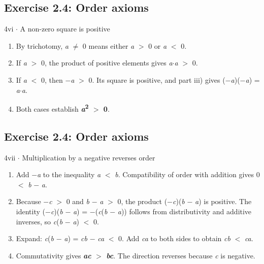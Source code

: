 \documentclass[11pt]{article}
\begin{document}
\begin{keepsection}\subsection{Exercise 2.4: Order axioms}

\begin{workedbox}{4vi \ensuremath{\cdot} A non-zero square is positive}
\begin{enumerate}
\item By trichotomy, \textit{a} \ensuremath{\neq} 0 means either \textit{a} \ensuremath{>} 0 or \textit{a} \ensuremath{<} 0.
\item If \textit{a} \ensuremath{>} 0, the product of positive elements gives \textit{a}\ensuremath{\cdot}\textit{a} \ensuremath{>} 0.
\item If \textit{a} \ensuremath{<} 0, then \ensuremath{-}\textit{a} \ensuremath{>} 0. Its square is positive, and part iii) gives (\ensuremath{-}\textit{a})(\ensuremath{-}\textit{a}) = \textit{a}\ensuremath{\cdot}\textit{a}.
\item Both cases establish \textbf{\textit{a}\textsuperscript{2} \ensuremath{>} 0}.
\end{enumerate}
\end{workedbox}

\end{keepsection}
\begin{keepsection}\subsection{Exercise 2.4: Order axioms}

\begin{workedbox}{4vii \ensuremath{\cdot} Multiplication by a negative reverses order}
\begin{enumerate}
\item Add \ensuremath{-}\textit{a} to the inequality \textit{a} \ensuremath{<} \textit{b}. Compatibility of order with addition gives 0 \ensuremath{<} \textit{b} \ensuremath{-} \textit{a}.
\item Because \ensuremath{-}\textit{c} \ensuremath{>} 0 and \textit{b} \ensuremath{-} \textit{a} \ensuremath{>} 0, the product (\ensuremath{-}\textit{c})(\textit{b} \ensuremath{-} \textit{a}) is positive. The identity (\ensuremath{-}\textit{c})(\textit{b} \ensuremath{-} \textit{a}) = \ensuremath{-}(\textit{c}(\textit{b} \ensuremath{-} \textit{a})) follows from distributivity and additive inverses, so \textit{c}(\textit{b} \ensuremath{-} \textit{a}) \ensuremath{<} 0.
\item Expand: \textit{c}(\textit{b} \ensuremath{-} \textit{a}) = \textit{c}\textit{b} \ensuremath{-} \textit{c}\textit{a} \ensuremath{<} 0. Add \textit{c}\textit{a} to both sides to obtain \textit{c}\textit{b} \ensuremath{<} \textit{c}\textit{a}.
\item Commutativity gives \textbf{\textit{a}\textit{c} \ensuremath{>} \textit{b}\textit{c}}. The direction reverses because \textit{c} is negative.
\end{enumerate}
\end{workedbox}

\end{keepsection}
\end{document}
